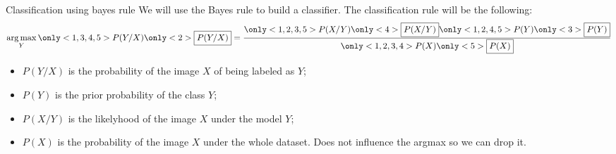 \bgroup  
\begin{frame}{Classification using bayes rule}
We will use the Bayes rule to build a classifier. The classification rule will be the following:
\begin{equation*}
\argmax_Y \only<1,3,4,5>{P(Y/X)} \only<2>{\boxed{P(Y/X)}} = \frac{\only<1,2,3,5>{P(X/Y)}\only<4>{\boxed{P(X/Y)}} \only<1,2,4,5>{P(Y)}\only<3>{\boxed{P(Y)}}}{\only<1,2,3,4>{P(X)}\only<5>{\boxed{P(X)}}}
\end{equation*}
\begin{itemize}
\item<2-> $P(Y/X)$ is the probability of the image $X$ of being labeled as $Y$;
\item<3-> $P(Y)$ is the prior probability of the class $Y$;
\item<4-> $P(X/Y)$ is the likelyhood of the image $X$ under the model $Y$;
\item<5-> $P(X)$ is the probability of the image $X$ under the whole dataset. Does not influence the argmax so we can drop it.
\end{itemize}
\end{frame}
\egroup